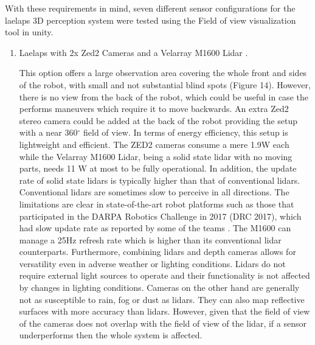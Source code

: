 \documentclass{article}
\begin{document}
With these requirements in mind, seven different sensor configurations for the laelaps 3D perception system were tested using the Field of view visualization tool in unity.

\begin{enumerate}
\item Laelaps with 2x Zed2 Cameras \cite{noauthor_zed_nodate} and a Velarray M1600 Lidar \cite{noauthor_velarray_nodate}.

This option offers a large observation area covering the whole front and sides of the robot, with small and not substantial blind spots (Figure 14). However, there is no view from the back of the robot, which could be useful in case the performs maneuvers which require it to move backwards. An extra Zed2 stereo camera could be added at the back of the robot providing the setup with a near 360$^{\circ}$ field of view.
In terms of energy efficiency, this setup is lightweight and efficient. The ZED2 cameras consume a mere 1.9W each \cite{stereolabs_zed2-camera-datasheet_nodate} while the Velarray M1600 Lidar, being a solid state lidar with no moving parts, needs 11 W \cite{velodyne_lidar_robotics_2022} at most to be fully operational. In addition, the update rate of solid state lidars is typically higher than that of conventional lidars. Conventional lidars are sometimes slow to perceive in all directions. The limitations are clear in state-of-the-art robot platforms such as those that participated in the DARPA Robotics Challenge in 2017 (DRC 2017), which had slow update rate as reported by some of the teams \cite{brandao_placing_2020}. The M1600 can manage a 25Hz refresh rate which is higher than its conventional lidar counterparts. Furthermore, combining lidars and depth cameras allows for versatility even in adverse weather or lighting conditions. Lidars do not require external light sources to operate and their functionality is not affected by changes in lighting conditions. Cameras on the other hand are generally not as susceptible to rain, fog or dust as lidars. They can also map reflective surfaces with more accuracy than lidars. However, given that the field of view of the cameras does not overlap with the field of view of the lidar, if a sensor underperforms then the whole system is affected. 


\end{enumerate}
\end{document}
